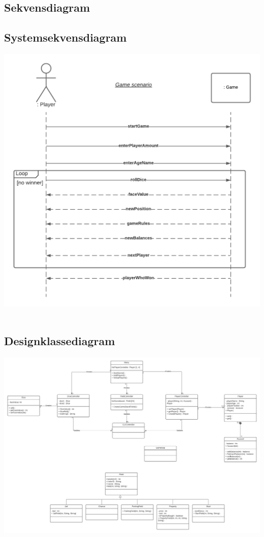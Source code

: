 \begin{flushleft}
\subsection{Sekvensdiagram}
\subsection{Systemsekvensdiagram}

\includegraphics[width=1\textwidth]{Report/figures/System sekvensdiagram.png}~\\[1cm]

\subsection{Designklassediagram}

\includegraphics[width=1\textwidth]{Report/figures/Class Diagram.png}~\\[1cm]

\end{flushleft}